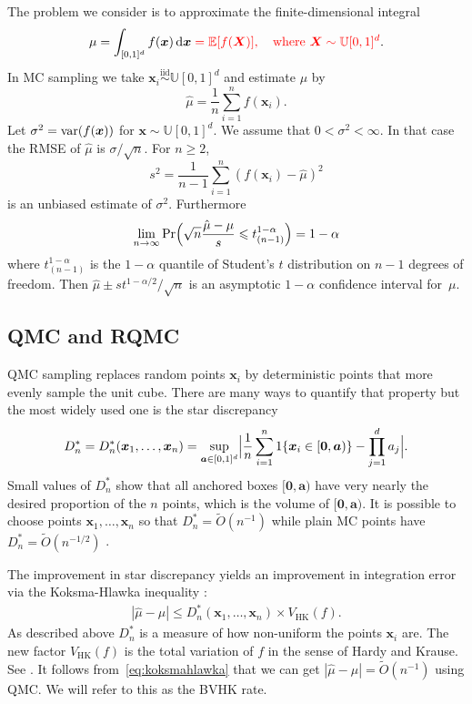 \documentclass{article}
\newcommand{\fred}[1]{\begingroup\color{red}#1\endgroup}
\renewcommand{\le}{\leqslant}
\renewcommand{\ge}{\geqslant}
\newcommand{\bsa}{\boldsymbol{a}}
\newcommand{\bsx}{\boldsymbol{x}}
\newcommand{\bszero}{\boldsymbol{0}}
\newcommand{\simiid}{\stackrel{\mathrm{iid}}{\sim}}
\newcommand{\dunif}{\mathbb{U}}
\newcommand{\hk}{\mathrm{HK}}
\newcommand{\rd}{\,\mathrm{d}}
\begin{document}
The problem we consider is to approximate the finite-dimensional
integral
$$\mu = \int_{[0,1]^d}f(\bsx)\rd\bsx \fred{= \mathbb{E}[f(\boldsymbol{X})], \quad \text{where } \boldsymbol{X} \sim \dunif[0,1]^d}.$$
In MC sampling we take $\bsx_i\simiid \dunif[0,1]^d$ and
estimate $\mu$ by
$$
\hat\mu = \frac1n\sum_{i=1}^nf(\bsx_i).
$$
Let $\sigma^2=\var(f(\bsx))$ for $\bsx\sim\dunif[0,1]^d$.
We assume that $0<\sigma^2<\infty$. In that case the RMSE
of $\hat\mu$ is $\sigma/\sqrt{n}$. For $n\ge2$,
$$s^2 =\frac1{n-1}\sum_{i=1}^n(f(\bsx_i)-\hat\mu)^2$$
is an unbiased estimate of $\sigma^2$. Furthermore
$$
\lim_{n\to\infty}\Pr\Bigl( \sqrt{n}\frac{\hat\mu-\mu}s\le t^{1-\alpha}_{(n-1)}\Bigr) = 1-\alpha
$$
where $t^{1-\alpha}_{(n-1)}$ is the $1-\alpha$ quantile of
Student's $t$ distribution on $n-1$ degrees of freedom.
Then $\hat\mu \pm st^{1-\alpha/2}/\sqrt{n}$ is an
asymptotic $1-\alpha$ confidence interval for~$\mu$.

\subsection{QMC and RQMC}

QMC sampling replaces random points $\bsx_i$ by 
deterministic points that more evenly sample the
unit cube.  There are many ways to quantify that 
property but the most widely used one is the
star discrepancy
$$
D_n^* = D_n^*(\bsx_1,\dots,\bsx_n)=\sup_{\bsa\in[0,1]^d}
\Bigl| \frac1n\sum_{i=1}^n1\{\bsx_i\in[\bszero,\bsa)\}
-\prod_{j=1}^da_j\Bigr|.
$$
Small values of $D_n^*$ show that all anchored boxes $[\bszero,\bsa)$
have very nearly the desired proportion of the $n$ points,
which is the volume of $[\bszero,\bsa)$.
It is possible to choose points $\bsx_1,\dots,\bsx_n$ so
that $D_n^*=\tilde O(n^{-1})$ while plain MC points
have $D_n^*=\tilde O(n^{-1/2})$ \cite{Nie92}.

The improvement in star discrepancy yields an improvement
in integration error via the Koksma-Hlawka inequality \cite{Hic04a}:
\begin{align}\label{eq:koksmahlawka}
|\hat\mu-\mu|\le D_n^*(\bsx_1,\dots,\bsx_n)\times V_{\hk}(f).
\end{align}
As described above $D_n^*$ is a measure of how non-uniform
the points $\bsx_i$ are. The new factor $V_{\hk}(f)$ is the
total variation of $f$ in the sense of Hardy and Krause.
See \cite{Owe05a}. It follows from~\eqref{eq:koksmahlawka} 
that we can get $|\hat\mu-\mu|=\tilde O(n^{-1})$
using QMC. We will refer to this as the BVHK rate.
\end{document}
